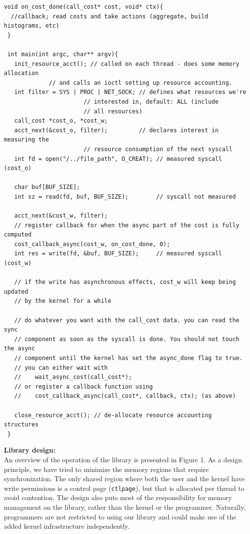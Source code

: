 \documentclass[12pt]{article}
\def\_{\textunderscore\-}
\begin{document}
\vspace{1em}
\lstset{style=customc, captionpos=b}
\begin{lstlisting}[caption=Sample code using the \texttt{rsrcfl} library]
 void on_cost_done(call_cost* cost, void* ctx){
  //callback; read costs and take actions (aggregate, build histograms, etc)
 }

 int main(int argc, char** argv){
   init_resource_acct(); // called on each thread - does some memory allocation
			 // and calls an ioctl setting up resource accounting.
   int filter = SYS | PROC | NET_SOCK; // defines what resources we're
				       // interested in, default: ALL (include
				       // all resources)
   call_cost *cost_o, *cost_w;
   acct_next(&cost_o, filter);         // declares interest in measuring the
				       // resource consumption of the next syscall
   int fd = open("/../file_path", O_CREAT); // measured syscall (cost_o)

   char buf[BUF_SIZE];
   int sz = read(fd, buf, BUF_SIZE);        // syscall not measured

   acct_next(&cost_w, filter);
   // register callback for when the async part of the cost is fully computed
   cost_callback_async(cost_w, on_cost_done, 0);
   int res = write(fd, &buf, BUF_SIZE);     // measured syscall (cost_w)

   // if the write has asynchronous effects, cost_w will keep being updated 
   // by the kernel for a while

   // do whatever you want with the call_cost data. you can read the sync
   // component as soon as the syscall is done. You should not touch the async
   // component until the kernel has set the async_done flag to true.
   // you can either wait with
   //    wait_async_cost(call_cost*);
   // or register a callback function using
   //    cost_callback_async(call_cost*, callback, ctx); (as above)

   close_resource_acct(); // de-allocate resource accounting structures
 }
 \end{lstlisting}
 
\pagebreak 
\noindent\textbf{Library design:\\}
An overview of the operation of the library is presented in Figure 1. As a design principle, we have tried to minimize the memory regions that require synchronization. The only shared region where both the user and the kernel have write permissions is a control page (\texttt{ctl\_page}), but that is allocated per thread to avoid contention. The design also puts most of the responsibility for memory management on the library, rather than the kernel or the programmer. Naturally, programmers are not restricted to using our library and could make use of the added kernel infrastructure independently.
\end{document}
